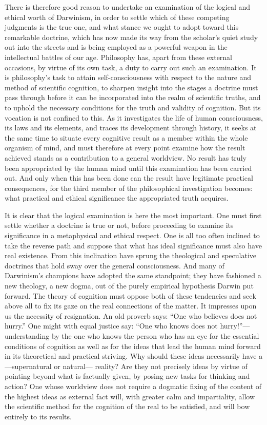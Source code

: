 \documentclass[12pt,a4paper]{article}
\begin{document}
There is therefore good reason to undertake an examination of the
logical and ethical worth of Darwinism, in order to settle which of
these competing judgments is the true one, and what stance we ought
to adopt toward this remarkable doctrine, which has now made its way
from the scholar's quiet study out into the streets and is being
employed as a powerful weapon in the intellectual battles of our age.
Philosophy has, apart from these external occasions, by virtue of its
own task, a duty to carry out such an examination. It is philosophy's
task to attain self-consciousness with respect to the nature and
method of scientific cognition, to sharpen insight into the stages a
doctrine must pass through before it can be incorporated into the
realm of scientific truths, and to uphold the necessary conditions for
the truth and validity of cognition. But its vocation is not confined
to this. As it investigates the life of human consciousness, its laws
and its elements, and traces its development through history, it seeks
at the same time to situate every cognitive result as a member within
the whole organism of mind, and must therefore at every point examine
how the result achieved stands as a contribution to a general
worldview. No result has truly been appropriated by the human mind
until this examination has been carried out. And only when this has
been done can the result have legitimate practical consequences, for
the third member of the philosophical investigation becomes: what
practical and ethical significance the appropriated truth acquires.

It is clear that the logical examination is here the most important.
One must first settle whether a doctrine is true or not, before
proceeding to examine its significance in a metaphysical and ethical
respect. One is all too often inclined to take the reverse path and
suppose that what has ideal significance must also have real existence.
From this inclination have sprung the theological and speculative
doctrines that hold sway over the general consciousness. And many of
Darwinism's champions have adopted the same standpoint; they have
fashioned a new theology, a new dogma, out of the purely empirical
hypothesis Darwin put forward. The theory of cognition must oppose
both of these tendencies and seek above all to fix its gaze on the
real connections of the matter. It impresses upon us the necessity of
resignation. An old proverb says: ``One who believes does not hurry.''
One might with equal justice say: ``One who knows does not hurry!''---
understanding by the one who knows the person who has an eye for the
essential conditions of cognition as well as for the ideas that lead
the human mind forward in its theoretical and practical striving. Why
should these ideas necessarily have a---supernatural or natural---
reality? Are they not precisely ideas by virtue of pointing beyond
what is factually given, by posing new tasks for thinking and action?
One whose worldview does not require a dogmatic fixing of the content
of the highest ideas as external fact will, with greater calm and
impartiality, allow the scientific method for the cognition of the
real to be satisfied, and will bow entirely to its results.
\end{document}
